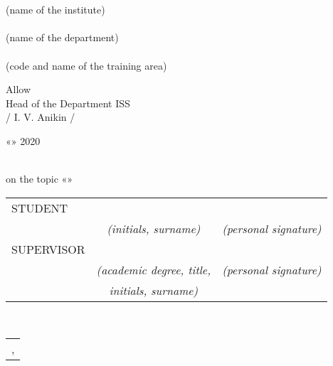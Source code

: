 \emergencystretch=25pt
\begin{titlepage}
	\begin{center}
		\hfill \break
		\normalsize{\universityeng}\\
		
		\hfill \break
		\underline{\normalsize{\instituteeng}}\\
		\small{(name of the institute)}\\
		\underline{\normalsize{\departmenteng}}\\
		\small{(name of the department)}\\
		
		\hfill\break
		\normalsize{\studieseng}\\
		\small{(code and name of the training area)}
	\end{center}
	\par\smallskip
	\begin{flushright}
		\normalsize{Allow}
		\\ \normalsize{Head of the Department ISS}
		\\ \normalsize{\underline{\hspace{1.2in}} / I. V. Anikin /}
		\\
		\rule{0cm}{1cm} \normalsize{«\underline{\hspace{0.45in}}» \underline{\hspace{1.2in}} 2020}
	\end{flushright}
	
	\par\smallskip
	
	\begin{center}
		\large{\thesistypeeng\\
			\large{on the topic «\thesistitleeng»}}\\
		\hfill \break
	\end{center}
	\normalsize{
		\begin{tabular}{lcr}
			STUDENT & \underline{\authorNameeng} &  \underline{\hspace{2.7in}}\\
			& \small\textit{(initials, surname)} & \small\textit{(personal signature)}\\
			SUPERVISOR & \underline{\tutoreng} &  \underline{\hspace{2.7in}}\\
			& \small\textit{(academic degree, title,} & \small\textit{(personal signature)}\\
			& \small\textit{initials, surname)}&
		\end{tabular}
	}\\
	
	\begin{table}[b!]
		\centering
		\begin{tabular}{c}
			\locationeng,  \submissiondateeng
		\end{tabular}
	\end{table}
	
	\thispagestyle{empty} %
	
\end{titlepage}
